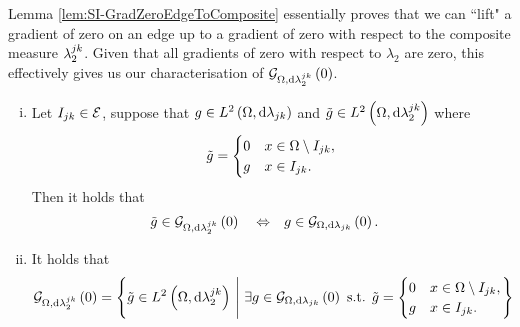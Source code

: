 Lemma \ref{lem:SI-GradZeroEdgeToComposite} essentially proves that we can ``lift" a gradient of zero on an edge up to a gradient of zero with respect to the composite measure $\lambda_2^{jk}$.
Given that all gradients of zero with respect to $\lambda_2$ are zero, this effectively gives us our characterisation of $\mathcal{G}_{ \Omega, \mathrm{d}\lambda_2^{jk}}\left( 0 \right)$.
\begin{cory} \label{cory:SI-GradZeroEdgeChar}
	\begin{enumerate}[(i)]
		\item Let $I_{jk}\in\mathcal{E}$, suppose that $g\in L^{2}\left( \Omega,\mathrm{d} \lambda_{jk} \right)$ and $\tilde{g}\in L^{2}\left( \Omega,\mathrm{d} \lambda_2^{jk} \right)$ where
		\begin{align*}
			\tilde{g} = \begin{cases} 0 & x\in\Omega\setminus I_{jk}, \\ g & x\in I_{jk}. \end{cases}
		\end{align*}
		Then it holds that
		\begin{align*}
			\tilde{g}\in\mathcal{G}_{ \Omega, \mathrm{d}\lambda_2^{jk}}\left( 0 \right) \quad\Leftrightarrow\quad 
			& g\in\mathcal{G}_{ \Omega, \mathrm{d}\lambda_{jk}}\left( 0 \right).
		\end{align*}
		\item It holds that
		\begin{align*}
			\mathcal{G}_{ \Omega, \mathrm{d}\lambda_2^{jk}}\left( 0 \right) 
			&= \left\{  \tilde{g}\in L^{2}\left( \Omega,\mathrm{d} \lambda_2^{jk} \right) \ \middle\vert \  \exists g\in\mathcal{G}_{ \Omega, \mathrm{d}\lambda_{jk}}\left( 0 \right) \text{ s.t. } \tilde{g} = \begin{cases} 0 & x\in\Omega\setminus I_{jk}, \\ g & x\in I_{jk}. \end{cases} \right\}
		\end{align*}
	\end{enumerate}
\end{cory}
